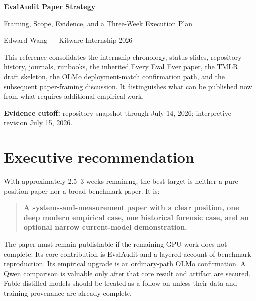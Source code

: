 \documentclass[11pt]{article}
\begin{document}

\begin{titlepage}
\centering
\vspace*{0.85in}
{\Huge\bfseries\color{kitblue} EvalAudit Paper Strategy\par}
\vspace{0.18in}
{\LARGE Framing, Scope, Evidence, and a Three-Week Execution Plan\par}
\vspace{0.55in}
{\Large Edward Wang --- Kitware Internship 2026\par}
\vfill
\begin{minipage}{0.84\textwidth}
\small
This reference consolidates the internship chronology, status slides, repository history, journals, runbooks, the inherited Every Eval Ever paper, the TMLR draft skeleton, the OLMo deployment-match confirmation path, and the subsequent paper-framing discussion. It distinguishes what can be published now from what requires additional empirical work.

\textbf{Evidence cutoff:} repository snapshot through July 14, 2026; interpretive revision July 15, 2026.
\end{minipage}
\end{titlepage}

\tableofcontents
\clearpage
{}

\section{Executive recommendation}

With approximately 2.5--3 weeks remaining, the best target is neither a pure position paper nor a broad benchmark paper. It is:

\begin{quote}
\textbf{A systems-and-measurement paper with a clear position, one deep modern empirical case, one historical forensic case, and an optional narrow current-model demonstration.}
\end{quote}

The paper must remain publishable if the remaining GPU work does not complete. Its core contribution is EvalAudit and a layered account of benchmark reproduction. Its empirical upgrade is an ordinary-path OLMo confirmation. A Qwen comparison is valuable only after that core result and artifact are secured. Fable-distilled models should be treated as a follow-on unless their data and training provenance are already complete.
\end{document}
